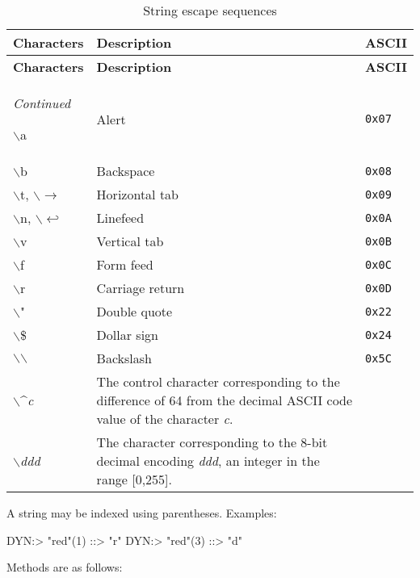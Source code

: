\documentclass[11pt]{article}
\newcommand{\esc}[1]{$\backslash$#1}
\begin{document}
\begin{longtable}[c]{l p{3.5in}|l}
  \caption{String escape sequences} \\
  {\bfseries Characters} & {\bfseries Description} & {\bfseries ASCII} \\ \hline
\endfirsthead
  {\bfseries Characters} & {\bfseries Description} & {\bfseries ASCII} \\ \hline
\endhead
  \hline \emph{Continued}
\endfoot
  \hline
\endlastfoot

\esc{a} & Alert & \verb|0x07| \\
\esc{b} & Backspace & \verb|0x08| \\
\esc{t}, \esc{$\rightarrow$} & Horizontal tab & \verb|0x09| \\
\esc{n}, \esc{$\hookleftarrow$}  & Linefeed & \verb|0x0A| \\
\esc{v} & Vertical tab & \verb|0x0B| \\
\esc{f} & Form feed & \verb|0x0C| \\
\esc{r} & Carriage return & \verb|0x0D| \\
\esc{"} & Double quote & \verb|0x22| \\
\esc{\$} & Dollar sign & \verb|0x24| \\
\esc{$\backslash$} & Backslash & \verb|0x5C| \\
\esc{\^{}\textit{c}} & The control character corresponding to the difference of 64 from the decimal ASCII code value of the character {\itshape c}. & \\
\esc{\textit{ddd}} & The character corresponding to the 8-bit decimal encoding {\itshape ddd}, an integer in the range [0,255]. & \\
\end{longtable}


A string may be indexed using parentheses.  Examples:


\begin{dynamo}
DYN:> "red"(1)
::> "r"
DYN:> "red"(3)
::> "d"
\end{dynamo}

Methods are as follows:
\end{document}
